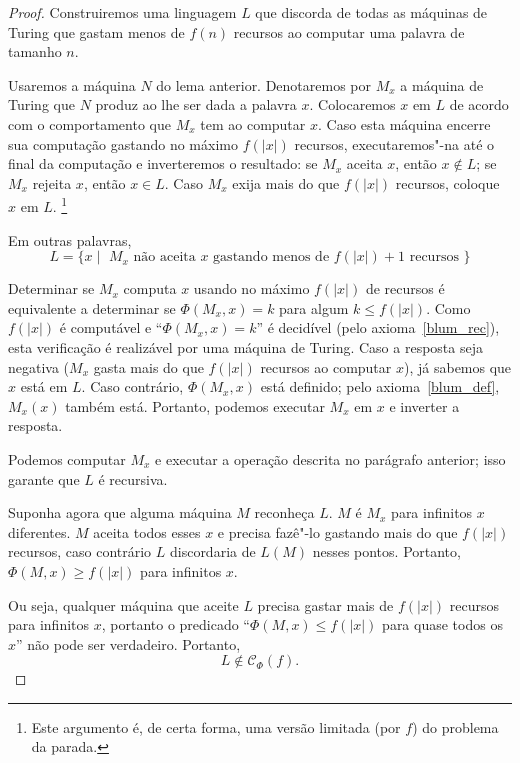 \begin{proof}
    Construiremos uma linguagem $L$
    que discorda de todas as máquinas de Turing que gastam menos de
    $f(n)$ recursos ao computar uma palavra de tamanho $n$.

    Usaremos a máquina $N$ do lema anterior.
    Denotaremos por $M_x$
    a máquina de Turing que $N$ produz
    ao lhe ser dada a palavra $x$.
    Colocaremos $x$ em $L$
    de acordo com o comportamento que $M_x$ tem ao computar $x$.
    Caso esta máquina encerre sua computação
    gastando no máximo $f(|x|)$ recursos,
    executaremos"-na até o final da computação
    e inverteremos o resultado:
    se $M_x$ aceita $x$, então $x \notin L$;
    se $M_x$ rejeita $x$, então $x \in L$.
    Caso $M_x$ exija mais do que $f(|x|)$ recursos,
    coloque $x$ em $L$.%
    \footnote{
        Este argumento é,
        de certa forma,
        uma versão limitada
        (por $f$)
        do problema da parada.
    }

    Em outras palavras,
    \begin{equation*}
        L = \{ x \mid \text{
            $M_x$ não aceita $x$ gastando menos de $f(|x|)+1$ recursos
        } \}
    \end{equation*}

    Determinar se $M_x$ computa $x$ usando no máximo $f(|x|)$ de recursos
    é equivalente a determinar se $\Phi(M_x, x) = k$
    para algum $k \leq f(|x|)$.
    Como $f(|x|)$ é computável
    e ``$\Phi(M_x, x) = k$'' é decidível
    (pelo axioma~\ref{blum_rec}),
    esta verificação é realizável por uma máquina de Turing.
    Caso a resposta seja negativa
    ($M_x$ gasta mais do que $f(|x|)$ recursos ao computar $x$),
    já sabemos que $x$ está em $L$.
    Caso contrário,
    $\Phi(M_x, x)$ está definido;
    pelo axioma~\ref{blum_def},
    $M_x(x)$ também está.
    Portanto, podemos executar $M_x$ em $x$
    e inverter a resposta.

    Podemos computar $M_x$ e executar a operação descrita no parágrafo anterior;
    isso garante que $L$ é recursiva.

    Suponha agora que alguma máquina $M$ reconheça $L$.
    $M$ é $M_x$ para infinitos $x$ diferentes.
    $M$ aceita todos esses $x$
    e precisa fazê"-lo gastando mais do que $f(|x|)$ recursos,
    caso contrário $L$ discordaria de $L(M)$ nesses pontos.
    Portanto, $\Phi(M, x) \geq f(|x|)$ para infinitos $x$.

    Ou seja, qualquer máquina que aceite $L$
    precisa gastar mais de $f(|x|)$ recursos para infinitos $x$,
    portanto o predicado ``$\Phi(M, x) \leq f(|x|)$ para quase todos os $x$''
    não pode ser verdadeiro.
    Portanto,
    \begin{equation*}
        L \notin \mathcal C_\Phi(f).
    \end{equation*}
\end{proof}
